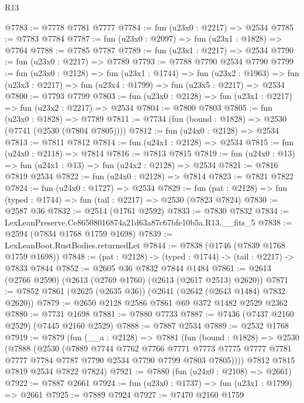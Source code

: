 \begin{lexlean}{R13}
\begin{coremodule}
@7783 := @7778 @7781 @7777
@7784 := fun (u23x0 : @2217) => @2534
@7785 := @7783 @7784
@7787 := fun (u23x0 : @2097) => fun (u23x1 : @1828) => @7764
@7788 := @7785 @7787
@7789 := fun (u23x1 : @2217) => @2534
@7790 := fun (u23x0 : @2217) => @7789
@7793 := @7788 @7790 @2534 @7790
@7799 := fun (u23x0 : @2128) =>
  fun (u23x1 : @1744) =>
  fun (u23x2 : @1963) => fun (u23x3 : @2217) => fun (u23x4 : @1799) => fun (u23x5 : @2217) => @2534
@7800 := @7793 @7799
@7803 := fun (u23x0 : @2128) => fun (u23x1 : @2217) => fun (u23x2 : @2217) => @2534
@7804 := @7800 @7803
@7805 := fun (u23x0 : @1828) => @7789
@7811 := @7734 (fun (bound : @1828) => @2530 (@7741 (@2530 (@7804 @7805))))
@7812 := fun (u24x0 : @2128) => @2534
@7813 := @7811 @7812
@7814 := fun (u24x1 : @2128) => @2534
@7815 := fun (u24x0 : @2118) => @7814
@7816 := @7813 @7815
@7819 := fun (u24x0 : @13) => fun (u24x1 : @13) => fun (u24x2 : @2128) => @2534
@7821 := @7816 @7819 @2534
@7822 := fun (u24x0 : @2128) => @7814
@7823 := @7821 @7822
@7824 := fun (u24x0 : @1727) => @2534
@7829 := fun (pat : @2128) => fun (typed : @1744) => fun (tail : @2217) => @2530 (@7823 @7824)
@7830 := @2587 @36
@7832 := @2514 (@1761 @2592)
@7833 := @7830 @7832
@7834 := LexLeanPreserve.Ce86508016874a21d63a87c67bfe10b5a.R13.__fits_5
@7838 := @2594 (@7834 @1768 @1759 @1698)
@7839 := LexLeanBoot.RustBodies.returnedLet
@7844 := @7838 (@1746 (@7839 @1768 @1759 @1698))
@7848 := (pat : @2128) -> (typed : @1744) -> (tail : @2217) -> @7833 @7844
@7852 := @2605 @36 @7832 @7844 @1484
@7861 := @2613 (@2766 @2590) (@2613 (@2769 @1760) (@2613 (@2617 @2513) @2620))
@7871 := @7852 @7861 (@2625 (@2635 @36)) (@2641 (@2642 (@2643 @1484) @7832 @2620))
@7879 := @2650 @2128 @2586 @7861 @69 @372 @1482 @2529 @2362
@7880 := @7731 @1698
@7881 := @7880 @7733
@7887 := @7436 (@7437 @2160 @2529) (@7445 @2160 @2529)
@7888 := @7887 @2534
@7889 := @2532 @1768
@7919 := @7879
    (fun (__a : @2128) =>
    @7881
      (fun (bound : @1828) =>
      @2530
        (@7888
          (@2530
            (@7889
              @7744
              @7762
              @7766
              @7771
              @7773
              @7775
              @7777
              @7781
              @7777
              @7784
              @7787
              @7790
              @2534
              @7790
              @7799
              @7803
              @7805))))
      @7812
      @7815
      @7819
      @2534
      @7822
      @7824)
@7921 := @7880 (fun (u24x0 : @2108) => @2661)
@7922 := @7887 @2661
@7924 := fun (u23x0 : @1737) => fun (u23x1 : @1799) => @2661
@7925 := @7889 @7924
@7927 := @7470 @2160 @1759

\end{coremodule}
\end{lexlean}
